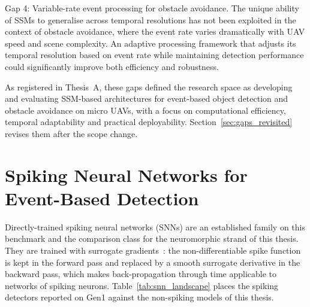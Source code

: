 \documentclass[11pt, a4paper]{report}
\begin{document}
Gap 4: Variable-rate event processing for obstacle avoidance. The unique ability of SSMs to generalise across temporal resolutions \cite{zubic2024state} has not been exploited in the context of obstacle avoidance, where the event rate varies dramatically with UAV speed and scene complexity. An adaptive processing framework that adjusts its temporal resolution based on event rate while maintaining detection performance could significantly improve both efficiency and robustness. 

As registered in Thesis~A, these gaps defined the research space as developing and evaluating SSM-based architectures for event-based object detection and obstacle avoidance on micro UAVs, with a focus on computational efficiency, temporal adaptability and practical deployability. Section~\ref{sec:gaps_revisited} revises them after the scope change. 


\section{Spiking Neural Networks for Event-Based Detection}
\label{sec:snn_detection}
Directly-trained spiking neural networks (SNNs) are an established family on this benchmark and the
comparison class for the neuromorphic strand of this thesis. They are trained with surrogate
gradients~\cite{neftci2019surrogate}: the non-differentiable spike function is kept in the forward pass
and replaced by a smooth surrogate derivative in the backward pass, which makes back-propagation through
time applicable to networks of spiking neurons. Table~\ref{tab:snn_landscape} places the spiking detectors
reported on Gen1 against the non-spiking models of this thesis.
\end{document}
